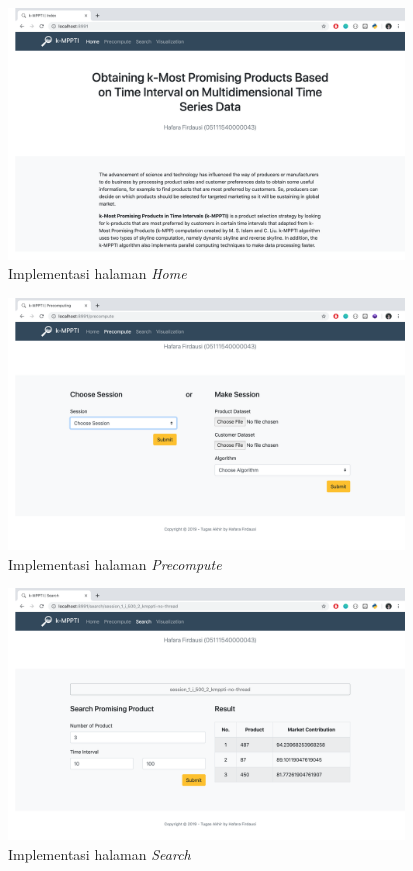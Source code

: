 \begin{figure}[H]
	\centering
	\includegraphics[width=10.5cm]{assets/img/bab4/home.png}
	\caption{Implementasi halaman \textit{Home}}
	\label{fig:home}
\end{figure}

\begin{figure}[H]
	\centering
	\includegraphics[width=10.5cm]{assets/img/bab4/precompute.png}
	\caption{Implementasi halaman \textit{Precompute}}
	\label{fig:precompute}
\end{figure}

\begin{figure}[H]
	\centering
	\includegraphics[width=10.5cm]{assets/img/bab4/search.png}
	\caption{Implementasi halaman \textit{Search}}
	\label{fig:search}
\end{figure}

